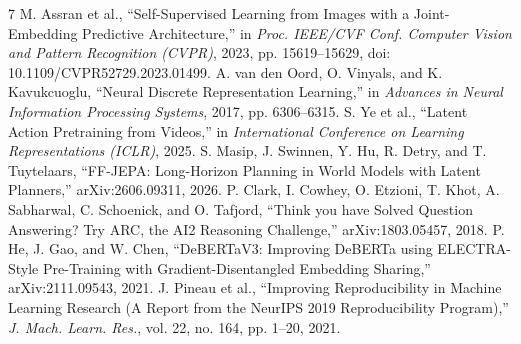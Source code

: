 \documentclass[conference]{IEEEtran}
\begin{document}
\balance
\begin{thebibliography}{7}
 M. Assran et al., ``Self-Supervised Learning from Images with a Joint-Embedding Predictive Architecture,'' in \emph{Proc. IEEE/CVF Conf. Computer Vision and Pattern Recognition (CVPR)}, 2023, pp. 15619--15629, doi: 10.1109/CVPR52729.2023.01499.
 A. van den Oord, O. Vinyals, and K. Kavukcuoglu, ``Neural Discrete Representation Learning,'' in \emph{Advances in Neural Information Processing Systems}, 2017, pp. 6306--6315.
 S. Ye et al., ``Latent Action Pretraining from Videos,'' in \emph{International Conference on Learning Representations (ICLR)}, 2025.
 S. Masip, J. Swinnen, Y. Hu, R. Detry, and T. Tuytelaars, ``FF-JEPA: Long-Horizon Planning in World Models with Latent Planners,'' arXiv:2606.09311, 2026.
 P. Clark, I. Cowhey, O. Etzioni, T. Khot, A. Sabharwal, C. Schoenick, and O. Tafjord, ``Think you have Solved Question Answering? Try ARC, the AI2 Reasoning Challenge,'' arXiv:1803.05457, 2018.
 P. He, J. Gao, and W. Chen, ``DeBERTaV3: Improving DeBERTa using ELECTRA-Style Pre-Training with Gradient-Disentangled Embedding Sharing,'' arXiv:2111.09543, 2021.
 J. Pineau et al., ``Improving Reproducibility in Machine Learning Research (A Report from the NeurIPS 2019 Reproducibility Program),'' \emph{J. Mach. Learn. Res.}, vol. 22, no. 164, pp. 1--20, 2021.
\end{thebibliography}
\end{document}
